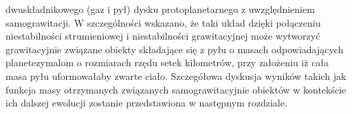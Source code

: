dwuskładnikowego (gaz i pył) dysku protoplanetarnego z uwzględnieniem
samograwitacji. W szczególności wskazano, że taki układ dzięki połączeniu
niestabilności strumieniowej i niestabilności grawitacyjnej może wytworzyć
grawitacyjnie związane obiekty składające się z pyłu o masach odpowiadających
planetezymalom o rozmiarach rzędu setek kilometrów, przy założeniu iż cała masa
pyłu uformowałaby zwarte ciało. Szczegółowa dyskusja wyników takich jak funkcja
masy otrzymanych związanych samograwitacyjnie obiektów w kontekście ich dalszej
ewolucji zostanie przedstawiona w następnym rozdziale.
%
%
%
%   
